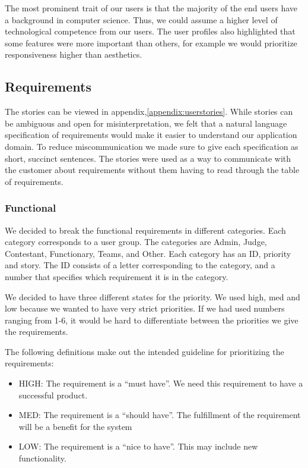 The most prominent trait of our users is that the majority of the end
users have a background in computer science. Thus, we could assume a
higher level of technological competence from our users. The user
profiles also highlighted that some features were more important than
others, for example we would prioritize responsiveness higher than
aesthetics.

\subsection{Requirements}
The stories can be viewed in appendix,\ref{appendix:userstories}. While
stories can be ambiguous and open for misinterpretation, we felt that a
natural language specification of requirements would make it easier to
understand our application domain. To reduce miscommunication we made
sure to give each specification as short, succinct sentences. The
stories were used as a way to communicate with the customer about
requirements without them having to read through the table of
requirements.

\subsubsection{Functional}
We decided to break the functional requirements in different categories.
Each category corresponds to a user group. The categories are Admin,
Judge, Contestant, Functionary, Teams, and Other. Each category has an ID, priority and story. The ID consists of a letter
corresponding to the category, and a number that specifies which
requirement it is in the category. 

We decided to have three different states for the priority. We used
high, med and low because we wanted to have very strict priorities.
If we had used numbers ranging from 1-6, it would be hard to
differentiate between the priorities we give the requirements.

The following definitions make out the intended guideline for
prioritizing the requirements:
\begin{itemize}
    \item HIGH: The requirement is a ``must have''. We need this requirement to
        have a successful product.
    \item MED: The requirement is a ``should have''. The fulfillment of the
        requirement will be a benefit for the system
    \item LOW: The requirement is a ``nice to have''. This may include new
        functionality.
\end{itemize}

